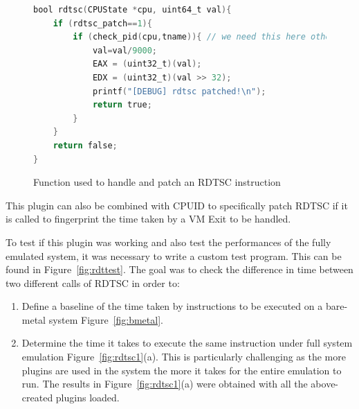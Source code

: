 \begin{figure}[htp]
\centering
\begin{lstlisting}[language=C]
bool rdtsc(CPUState *cpu, uint64_t val){
    if (rdtsc_patch==1){
        if (check_pid(cpu,tname)){ // we need this here otherwise it will segfault
            val=val/9000;
            EAX = (uint32_t)(val);
            EDX = (uint32_t)(val >> 32);
            printf("[DEBUG] rdtsc patched!\n");
            return true;
        }
    }
    return false;
}
\end{lstlisting}
\caption{Function used to handle and patch an RDTSC instruction}
\label{fig:rdtscpatch}
\end{figure}

This plugin can also be combined with CPUID to specifically patch RDTSC if it is called to fingerprint the time taken by a VM Exit to be handled. 

To test if this plugin was working and also test the performances of the fully emulated system, it was necessary to write a custom test program. This can be found in Figure~\ref{fig:rdttest}. The goal was to check the difference in time between two different calls of RDTSC in order to:

\begin{enumerate}
    \item Define a baseline of the time taken by instructions to be executed on a bare-metal system Figure~\ref{fig:bmetal}.
    \item Determine the time it takes to execute the same instruction under full system emulation Figure~\ref{fig:rdtsc1}(a). This is particularly challenging as the more plugins are used in the system the more it takes for the entire emulation to run. The results in Figure~\ref{fig:rdtsc1}(a) were obtained with all the above-created plugins loaded. 
\end{enumerate}


